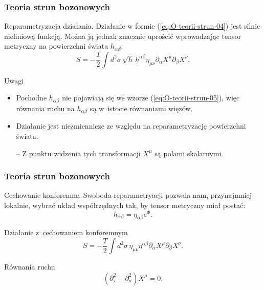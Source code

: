 \documentclass[10pt,t]{beamer}
\begin{document}
\begin{frame}
  \frametitle{Teoria strun bozonowych}


  Reparametryzacja działania. Działanie w formie
  (\ref{eq:O-teorii-strun-04}) jest silnie nieliniową funkcją.
  Można ją jednak znacznie uprościć wprowadzając tensor metryczny na
  powierzchni świata $h_{ \alpha \beta }$:
  \begin{equation}
    \label{eq:O-teorii-strun-05}
    S =
    -\frac{ T }{ 2 } \int d^{ 2 }\sigma \, \sqrt{ h } \, h^{ \alpha \beta } \eta_{ \mu \nu }
    \partial_{ \alpha } X^{ \mu } \partial_{ \beta } X^{ \nu }.
  \end{equation}

  Uwagi
  \begin{itemize}
    \RaggedRight

  \item Pochodne $h_{ \alpha \beta }$ nie pojawiają się we wzorze
    (\ref{eq:O-teorii-strun-05}), więc równania ruchu na $h_{ \alpha \beta }$ są
    w~istocie równaniami więzów.

  \item Działanie jest niezmiennicze ze względu na reparametryzację
    powierzchni świata.

  \item[--] Z punktu widzenia tych transformacji $X^{ \mu }$ są polami
    skalarnymi.

  \end{itemize}

\end{frame}





\begin{frame}
  \frametitle{Teoria strun bozonowych}


  Cechowanie konforemne. Swoboda reparametryacji pozwala nam, przynajmniej
  lokalnie, wybrać układ współrzędnych tak, by tensor metryczny miał postać:
  \begin{equation}
    \label{eq:O-teorii-strun-06}
    h_{ \alpha \beta } = \eta_{ \alpha \beta } e^{ \Phi }.
  \end{equation}

  Działanie z~cechowaniem konforemnym
  \begin{equation}
    \label{eq:O-teorii-strun-07}
    S =
    -\frac{ T }{ 2 } \int d^{ 2 } \sigma \, \eta_{ \mu \nu } \eta^{ \alpha \beta } \partial_{ \alpha } X^{ \mu }
    \partial_{ \beta } X^{ \nu }.
  \end{equation}

  Równania ruchu
  \begin{equation}
    \label{eq:O-teorii-strun-07}
    ( \partial_{ \tau }^{ 2 } - \partial_{ \sigma }^{ 2 } ) X^{ \mu } = 0.
  \end{equation}

\end{frame}
\end{document}
